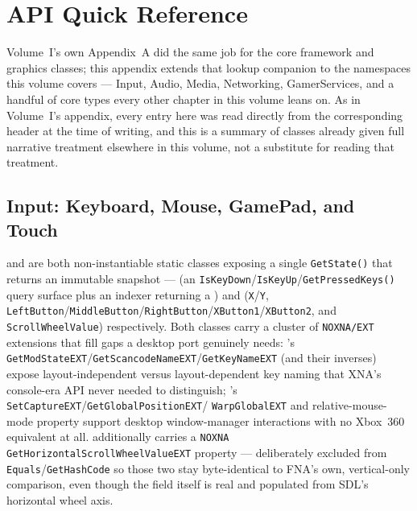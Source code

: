 \chapter{API Quick Reference}
\label{ch:api-quick-reference-vol2}

Volume~I's own Appendix~A did the same job for the core framework and graphics classes; this
appendix extends that lookup companion to the namespaces this volume covers --- Input, Audio,
Media, Networking, GamerServices, and a handful of  core types every
other chapter in this volume leans on. As in Volume~I's appendix, every entry here was read
directly from the corresponding header at the time of writing, and this is a summary of classes
already given full narrative treatment elsewhere in this volume, not a substitute for reading
that treatment.

\section{Input: Keyboard, Mouse, GamePad, and Touch}
\label{sec:api-input}

 and  are both non-instantiable static classes exposing a
single \texttt{GetState()} that returns an immutable snapshot ---  (an
\texttt{IsKeyDown}/\texttt{IsKeyUp}/\texttt{GetPressedKeys()} query surface plus an indexer
returning a ) and  (\texttt{X}/\texttt{Y},
\texttt{LeftButton}/\texttt{MiddleButton}/\texttt{RightButton}/\texttt{XButton1}/\texttt{XButton2},
and \texttt{ScrollWheelValue}) respectively. Both classes carry a cluster of \texttt{NOXNA/EXT}
extensions that fill gaps a desktop port genuinely needs: 's
\texttt{GetModStateEXT}/\texttt{GetScancodeNameEXT}/\texttt{GetKeyNameEXT} (and their inverses)
expose layout-independent versus layout-dependent key naming that XNA's console-era API never
needed to distinguish; 's \texttt{SetCaptureEXT}/\texttt{GetGlobalPositionEXT}/%
\texttt{WarpGlobalEXT} and relative-mouse-mode property support desktop window-manager
interactions with no Xbox~360 equivalent at all.  additionally carries a
\texttt{NOXNA GetHorizontalScrollWheelValueEXT} property --- deliberately excluded from
\texttt{Equals}/\texttt{GetHashCode} so those two stay byte-identical to FNA's own, vertical-only
comparison, even though the field itself is real and populated from SDL's horizontal wheel axis.

